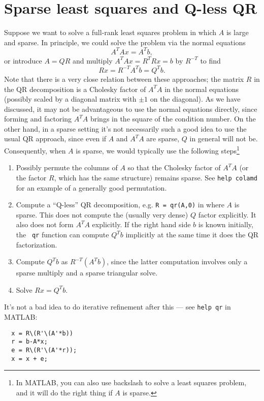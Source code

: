 \documentclass[12pt, leqno]{article}
\begin{document}


\section*{Sparse least squares and Q-less QR}

Suppose we want to solve a full-rank least squares problem in which $A$
is large and sparse.  In principle, we could solve the problem via the
normal equations
\[
  A^T A x = A^T b,
\]
or introduce $A = QR$ and multiply $A^T A x = R^T R x = b$ by $R^{-T}$ to find
\[
  R x = R^{-T} A^T b = Q^T b.
\]
Note that there is a very close relation between these approaches; the
matrix $R$ in the QR decomposition is a Cholesky factor of $A^T A$ in
the normal equations (possibly scaled by a diagonal matrix with
$\pm 1$ on the diagonal).  As we have discussed, it may not be advantageous to 
use the normal equations directly, since forming and factoring $A^T A$
brings in the square of the condition number.  On the other hand,
in a sparse setting it's not necessarily such a good idea to use the
usual QR approach, since even if $A$ and $A^TA$ are sparse, $Q$ in general
will not be.  Consequently, when $A$ is sparse, we would typically use the
following steps\footnote{%
In MATLAB, you can also use backslash
to solve a least squares problem, and it will do the right thing if
$A$ is sparse.}
\begin{enumerate}
\item
  Possibly permute the columns of $A$ so that the Cholesky factor of $A^T A$
  (or the factor $R$, which has the same structure) remains sparse.
  See {\tt help colamd} for an example of a generally good permutation.
\item
  Compute a ``Q-less'' QR decomposition, e.g. {\tt R = qr(A,0)} in \matlab
  where $A$ is sparse.  This does not compute the (usually very dense) $Q$
  factor explicitly.  It also does not form $A^T A$ explicitly.  If
  the right hand side $b$ is known initially, the \matlab\ {\tt qr}
  function can compute $Q^T b$ implicitly at the same time it does the
  QR factorization.
\item
  Compute $Q^T b$ as $R^{-T} (A^T b)$, since the latter computation involves
  only a sparse multiply and a sparse triangular solve.
\item
  Solve $R x = Q^T b$.
\end{enumerate}
It's not a bad idea to do iterative refinement after this --- see {\tt help qr}
in MATLAB:
\begin{lstlisting}
  x = R\(R'\(A'*b))
  r = b-A*x;
  e = R\(R'\(A'*r));
  x = x + e;
\end{lstlisting}
\end{document}
